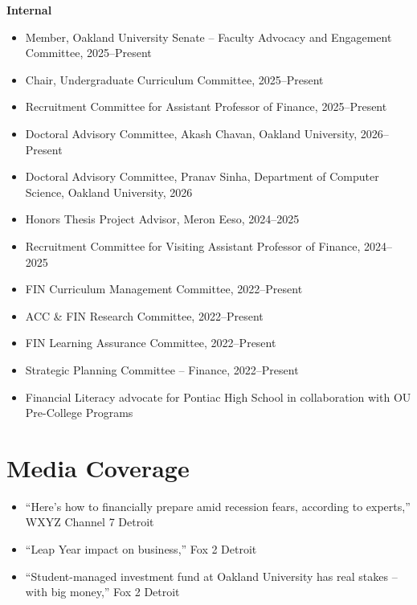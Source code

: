 \documentclass[letterpaper,11pt]{article}
\newcommand{\sectionspacing}{\vspace{-2mm}}
\begin{document}
\vspace{1mm}
\small{\textbf{Internal}}
\vspace{-1mm}
\begin{itemize}[leftmargin=*, labelsep=1mm, itemsep=0.5mm]
    \small
    \item Member, Oakland University Senate -- Faculty Advocacy and Engagement Committee, 2025--Present
    \item Chair, Undergraduate Curriculum Committee, 2025--Present
    \item Recruitment Committee for Assistant Professor of Finance, 2025--Present
    \item Doctoral Advisory Committee, Akash Chavan, Oakland University, 2026--Present
    \item Doctoral Advisory Committee, Pranav Sinha, Department of Computer Science, Oakland University, 2026
    \item Honors Thesis Project Advisor, Meron Eeso, 2024--2025
    \item Recruitment Committee for Visiting Assistant Professor of Finance, 2024--2025
    \item FIN Curriculum Management Committee, 2022--Present
    \item ACC \& FIN Research Committee, 2022--Present
    \item FIN Learning Assurance Committee, 2022--Present
    \item Strategic Planning Committee -- Finance, 2022--Present
    \item Financial Literacy advocate for Pontiac High School in collaboration with OU Pre-College Programs
\end{itemize}
\sectionspacing
\section{\textbf{Media Coverage}}
\vspace{-0.4mm}
\begin{itemize}[leftmargin=*, labelsep=1mm, itemsep=0.5mm]
    \small
    \item ``Here's how to financially prepare amid recession fears, according to experts,'' WXYZ Channel 7 Detroit
    \item ``Leap Year impact on business,'' Fox 2 Detroit
    \item ``Student-managed investment fund at Oakland University has real stakes -- with big money,'' Fox 2 Detroit
\end{itemize}
\sectionspacing
\end{document}
